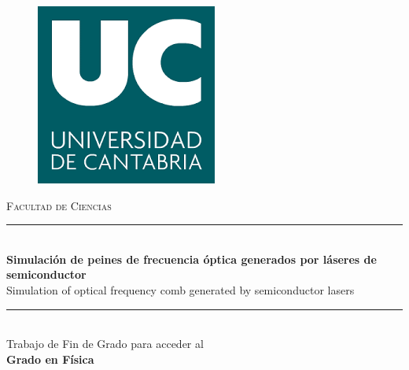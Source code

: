 \documentclass[a4paper, 11pt, oneside]{book}
\begin{document}
		\begin{titlepage} 

			\newcommand{\HRule}{\rule{\linewidth}{0.5mm}} 
			
			\center %
			
			
				
					\begin{figure}[H]
						\centering
						\includegraphics[scale=0.6]{download.png}
					\end{figure}

					\textsc{\LARGE Facultad de Ciencias}\\[1.5cm] 
			
			
			
				\HRule\\[0.4cm]
				
				{\huge\bfseries Simulación de peines de frecuencia óptica generados por láseres de semiconductor}\\[0.8cm] %

				{\huge Simulation of optical frequency comb generated by semiconductor lasers}\\[0.4cm] %
				
				\HRule\\[1.5cm]

				{\Large Trabajo de Fin de Grado para acceder al}\\[0.4cm]

				{\LARGE\bfseries Grado en Física}\\[3cm]
			

\end{titlepage}
\end{document}
